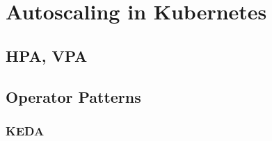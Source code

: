 \newpage
\section{Autoscaling in Kubernetes}


\subsection{HPA, VPA}

\subsection{Operator Patterns}

\subsubsection{KEDA}